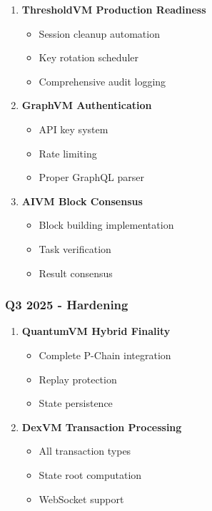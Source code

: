 \documentclass[
]{article}
\providecommand{\tightlist}{%
  \setlength{\itemsep}{0pt}\setlength{\parskip}{0pt}}
\begin{document}
\begin{enumerate}
\def\labelenumi{\arabic{enumi}.}
\setcounter{enumi}{3}
\item
  \textbf{ThresholdVM Production Readiness}

  \begin{itemize}
  \tightlist
  \item
    Session cleanup automation
  \item
    Key rotation scheduler
  \item
    Comprehensive audit logging
  \end{itemize}
\item
  \textbf{GraphVM Authentication}

  \begin{itemize}
  \tightlist
  \item
    API key system
  \item
    Rate limiting
  \item
    Proper GraphQL parser
  \end{itemize}
\item
  \textbf{AIVM Block Consensus}

  \begin{itemize}
  \tightlist
  \item
    Block building implementation
  \item
    Task verification
  \item
    Result consensus
  \end{itemize}
\end{enumerate}

\subsubsection{Q3 2025 - Hardening}\label{q3-2025---hardening}

\begin{enumerate}
\def\labelenumi{\arabic{enumi}.}
\setcounter{enumi}{6}
\item
  \textbf{QuantumVM Hybrid Finality}

  \begin{itemize}
  \tightlist
  \item
    Complete P-Chain integration
  \item
    Replay protection
  \item
    State persistence
  \end{itemize}
\item
  \textbf{DexVM Transaction Processing}

  \begin{itemize}
  \tightlist
  \item
    All transaction types
  \item
    State root computation
  \item
    WebSocket support
  \end{itemize}
\end{enumerate}
\end{document}
